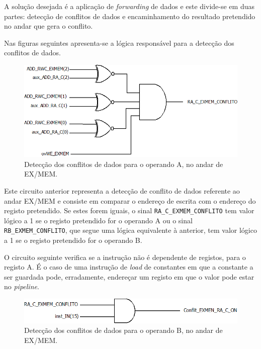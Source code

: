 \documentclass[11pt]{article}
\numberwithin{equation}{section}
\begin{document}
A solução desejada é a aplicação de \textit{forwarding} de dados e este divide-se em duas partes: detecção de conflitos de dados e encaminhamento do resultado pretendido no andar que gera o conflito.

Nas figuras seguintes apresenta-se a lógica responsável para a detecção dos conflitos de dados.

\begin{figure}[H]
	\centering
	\includegraphics[keepaspectratio=true, scale=0.27]{imagens/DetecaodeconflitoEXMEM}
	\vspace{-0.5em}
	\caption{Detecção dos conflitos de dados para o operando A, no andar de EX/MEM.}
	\vspace{-0.8em}
\end{figure} 

Este circuito anterior representa a detecção de conflito de dados referente ao andar EX/MEM e consiste em comparar o endereço de escrita com o endereço do registo pretendido. Se estes forem iguais, o sinal \texttt{RA\_C\_EXMEM\_CONFLITO} tem valor lógico a 1 se o registo pretendido for o operando A ou o sinal \texttt{RB\_EXMEM\_CONFLITO}, que segue uma lógica equivalente à anterior, tem valor lógico a 1 se o registo pretendido for o operando B.

O circuito seguinte verifica se a instrução não é dependente de registos, para o registo A. É o caso de uma instrução de \textit{load} de constantes em que a constante a ser guardada pode, erradamente, endereçar um registo em que o valor pode estar no \textit{pipeline}. 

\begin{figure}[H]
	\centering
	\includegraphics[keepaspectratio=true, scale=0.27]{imagens/DetecaodeconflitoEXMEM2}
	\vspace{-0.5em}
	\caption{Detecção dos conflitos de dados para o operando B, no andar de EX/MEM.}
	\vspace{-0.8em}
\end{figure} 
\end{document}
